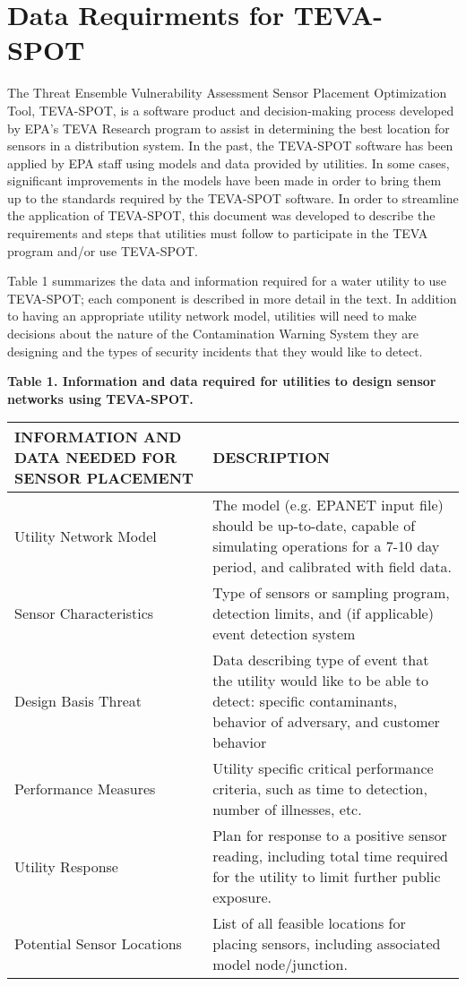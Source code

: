 \section{Data Requirments for TEVA-SPOT}\label{data_TEVASPOT}

The Threat Ensemble Vulnerability Assessment Sensor Placement Optimization Tool, TEVA-SPOT, is a software product and decision-making process developed by EPA's TEVA Research program to assist in determining the best location for sensors in a distribution system. In the past, the TEVA-SPOT software has been applied by EPA staff using models and data provided by utilities. In some cases, significant improvements in the models have been made in order to bring them up to the standards required by the TEVA-SPOT software.  In order to streamline the application of TEVA-SPOT, this document was developed to describe the requirements and steps that utilities must follow to participate in the TEVA program and/or use TEVA-SPOT.  

Table 1 summarizes the data and information required for a water utility to use TEVA-SPOT; each component is described in more detail in the text.  In addition to having an appropriate utility network model, utilities will need to make decisions about the nature of the Contamination Warning System they are designing and the types of security incidents that they would like to detect.

{\bf Table 1.  Information and data required for utilities to design sensor networks using TEVA-SPOT.}
\begin{center}
  \begin{tabular}{ | p{5cm} | p{10cm} | }
    \hline
    INFORMATION AND DATA NEEDED FOR SENSOR PLACEMENT & DESCRIPTION  \\ \hline
    Utility Network Model  & The model (e.g. EPANET input file) should be up-to-date, capable of simulating operations for a 7-10 day period, and calibrated with field data.  \\ \hline
    Sensor Characteristics & Type of sensors or sampling program, detection limits, and (if applicable) event detection system \\ \hline
    Design Basis Threat & Data describing type of event that the utility would like to be able to detect: specific contaminants, behavior of adversary, and customer behavior \\ \hline
    Performance Measures & Utility specific critical performance criteria, such as time to detection, number of illnesses, etc. \\ \hline
    Utility Response & Plan for response to a positive sensor reading, including total time required for the utility to limit further public exposure. \\ \hline
    Potential Sensor Locations & List of all feasible locations for placing sensors, including associated model node/junction. \\
    \hline
  \end{tabular}
\end{center}

